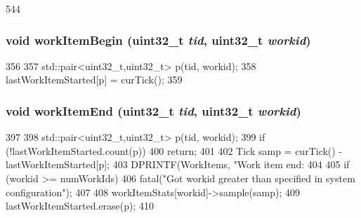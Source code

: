 \begin{DoxyCode}
544                                                              {}
\end{DoxyCode}
\hypertarget{classSystem_ad4b75de1d7e8c59fae68c3d0c1aa10d0}{
\subsubsection[{workItemBegin}]{\setlength{\rightskip}{0pt plus 5cm}void workItemBegin ({\bf uint32\_\-t} {\em tid}, \/  {\bf uint32\_\-t} {\em workid})}}
\label{classSystem_ad4b75de1d7e8c59fae68c3d0c1aa10d0}



\begin{DoxyCode}
356     {
357         std::pair<uint32_t,uint32_t> p(tid, workid);
358         lastWorkItemStarted[p] = curTick();
359     }
\end{DoxyCode}
\hypertarget{classSystem_a5a8ccc590b04e540dab229b302e29c88}{
\subsubsection[{workItemEnd}]{\setlength{\rightskip}{0pt plus 5cm}void workItemEnd ({\bf uint32\_\-t} {\em tid}, \/  {\bf uint32\_\-t} {\em workid})}}
\label{classSystem_a5a8ccc590b04e540dab229b302e29c88}



\begin{DoxyCode}
397 {
398     std::pair<uint32_t,uint32_t> p(tid, workid);
399     if (!lastWorkItemStarted.count(p))
400         return;
401 
402     Tick samp = curTick() - lastWorkItemStarted[p];
403     DPRINTF(WorkItems, "Work item end: %
404 
405     if (workid >= numWorkIds)
406         fatal("Got workid greater than specified in system configuration\n");
407 
408     workItemStats[workid]->sample(samp);
409     lastWorkItemStarted.erase(p);
410 }
\end{DoxyCode}


